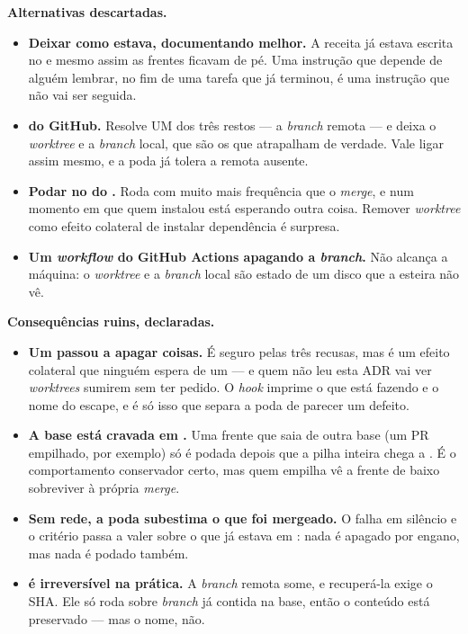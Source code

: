 \textbf{Alternativas descartadas.}

\begin{itemize}
  \item \textbf{Deixar como estava, documentando melhor.} A receita já estava
    escrita no  e mesmo assim as frentes ficavam de pé. Uma
    instrução que depende de alguém lembrar, no fim de uma tarefa que já
    terminou, é uma instrução que não vai ser seguida.
  \item \textbf{ do GitHub.} Resolve UM dos três
    restos --- a \emph{branch} remota --- e deixa o \emph{worktree} e a
    \emph{branch} local, que são os que atrapalham de verdade. Vale ligar assim
    mesmo, e a poda já tolera a remota ausente.
  \item \textbf{Podar no  do .} Roda com muito mais
    frequência que o \emph{merge}, e num momento em que quem instalou está
    esperando outra coisa. Remover \emph{worktree} como efeito colateral de
    instalar dependência é surpresa.
  \item \textbf{Um \emph{workflow} do GitHub Actions apagando a \emph{branch}.}
    Não alcança a máquina: o \emph{worktree} e a \emph{branch} local são estado
    de um disco que a esteira não vê.
\end{itemize}

\textbf{Consequências ruins, declaradas.}

\begin{itemize}
  \item \textbf{Um  passou a apagar coisas.} É seguro pelas três
    recusas, mas é um efeito colateral que ninguém espera de um  --- e
    quem não leu esta ADR vai ver \emph{worktrees} sumirem sem ter pedido. O
    \emph{hook} imprime o que está fazendo e o nome do escape, e é só isso que
    separa a poda de parecer um defeito.
  \item \textbf{A base está cravada em .} Uma frente que
    saia de outra base (um PR empilhado, por exemplo) só é podada depois que a
    pilha inteira chega a . É o comportamento conservador certo,
    mas quem empilha vê a frente de baixo sobreviver à própria \emph{merge}.
  \item \textbf{Sem rede, a poda subestima o que foi mergeado.} O 
    falha em silêncio e o critério passa a valer sobre o que já estava em
    : nada é apagado por engano, mas nada é podado também.
  \item \textbf{ é irreversível na prática.} A
    \emph{branch} remota some, e recuperá-la exige o SHA. Ele só roda sobre
    \emph{branch} já contida na base, então o conteúdo está preservado --- mas o
    nome, não.
\end{itemize}

